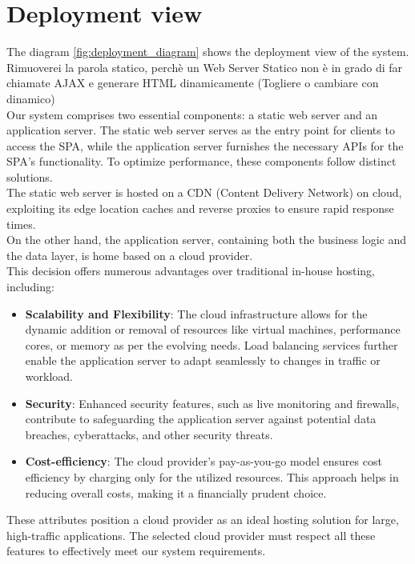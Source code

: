 \section{Deployment view}
The diagram \ref{fig:deployment_diagram} shows the deployment view of the system.\\
{\color{red} Rimuoverei la parola statico, perchè un Web Server Statico non è in grado di far chiamate AJAX e generare HTML dinamicamente (Togliere o cambiare con dinamico)\\}
Our system comprises two essential components: a static web server and an application server. 
The static web server serves as the entry point for clients to access the SPA, while the application server furnishes the necessary APIs for the SPA's functionality. 
To optimize performance, these components follow distinct solutions.\\
The static web server is hosted on a CDN (Content Delivery Network) on cloud, exploiting its edge location caches and reverse proxies to ensure rapid response times. \\
On the other hand, the application server, containing both the business logic and the data layer, is home based on a cloud provider. \\
This decision offers numerous advantages over traditional in-house hosting, including:
\begin{itemize}
    \item \textbf{Scalability and Flexibility}: The cloud infrastructure allows for the dynamic addition or removal of resources like virtual machines, performance cores, or memory as per the evolving needs. Load balancing services further enable the application server to adapt seamlessly to changes in traffic or workload.
    \item \textbf{Security}: Enhanced security features, such as live monitoring and firewalls, contribute to safeguarding the application server against potential data breaches, cyberattacks, and other security threats.
    \item \textbf{Cost-efficiency}: The cloud provider's pay-as-you-go model ensures cost efficiency by charging only for the utilized resources. This approach helps in reducing overall costs, making it a financially prudent choice.
\end{itemize}
These attributes position a cloud provider as an ideal hosting solution for large, high-traffic applications. 
The selected cloud provider must respect all these features to effectively meet our system requirements.

